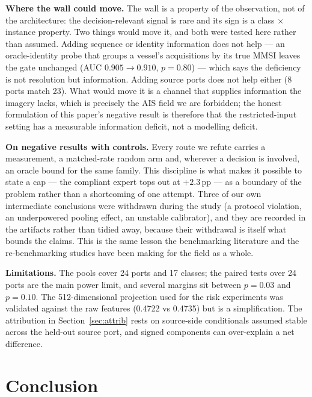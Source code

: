 \documentclass[journal]{IEEEtran}
\begin{document}
\textbf{Where the wall could move.} The wall is a property of the observation, not of the architecture:
the decision-relevant signal is rare and its sign is a class $\times$ instance property. Two things
would move it, and both were tested here rather than assumed. Adding sequence or identity information
does not help --- an oracle-identity probe that groups a vessel's acquisitions by its true MMSI leaves
the gate unchanged (AUC $0.905 \rightarrow 0.910$, $p = 0.80$) --- which says the deficiency is not
resolution but information. Adding source ports does not help either (8 ports match 23). What would
move it is a channel that supplies information the imagery lacks, which is precisely the AIS field we
are forbidden; the honest formulation of this paper's negative result is therefore that the
restricted-input setting has a measurable information deficit, not a modelling deficit.

\textbf{On negative results with controls.} Every route we refute carries a measurement, a matched-rate
random arm and, wherever a decision is involved, an oracle bound for the same family. This discipline
is what makes it possible to state a cap --- the compliant expert tops out at $+2.3$\,pp --- as a
boundary of the problem rather than a shortcoming of one attempt. Three of our own intermediate
conclusions were withdrawn during the study (a protocol violation, an underpowered pooling effect, an
unstable calibrator), and they are recorded in the artifacts rather than tidied away, because their
withdrawal is itself what bounds the claims. This is the same lesson the benchmarking literature
\cite{bouthillier2021accounting} and the re-benchmarking studies \cite{musgrave2020metric,recht2019imagenet}
have been making for the field as a whole.

\textbf{Limitations.} The pools cover 24 ports and 17 classes; the paired tests over 24 ports are the
main power limit, and several margins sit between $p = 0.03$ and $p = 0.10$. The 512-dimensional
projection used for the risk experiments was validated against the raw features (0.4722 vs 0.4735) but
is a simplification. The attribution in Section~\ref{sec:attrib} rests on source-side conditionals
assumed stable across the held-out source port, and signed components can over-explain a net
difference.

\section{Conclusion}
\label{sec:concl}
\end{document}
